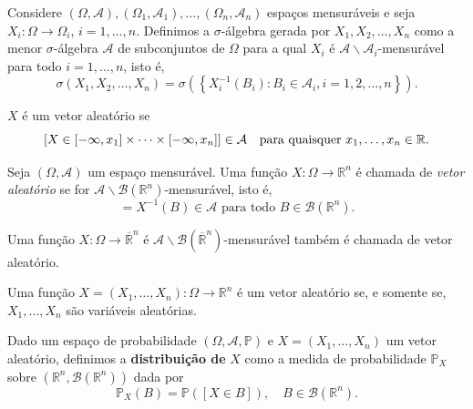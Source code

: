 \begin{definition} 
	Considere $(\Omega, \mathcal{A}), (\Omega_1, \mathcal{A}_1), \ldots, (\Omega_n, \mathcal{A}_n)$ espaços mensuráveis e seja $X_i: \Omega \rightarrow \Omega_i$, $i = 1, \ldots, n$. Definimos a $\sigma$-álgebra gerada por $X_1, X_2, \ldots, X_n$ como a menor $\sigma$-álgebra $\mathcal{A}$ de subconjuntos de $\Omega$ para a qual $X_i$ é $\mathcal{A}\backslash\mathcal{A}_i$-mensurável para todo $i = 1, \ldots, n$, isto é,
	\begin{equation}
		\sigma(X_1, X_2, \ldots, X_n) = \sigma\left(\left\{X_i^{-1}(B_i) : B_i \in \mathcal{A}_i, i = 1, 2, \ldots, n\right\}\right).
	\end{equation}
\end{definition}

\begin{theorem}
	$X$ é um vetor aleatório se
	\begin{equation}
		\left[X \in [-\infty,x_1]\times\cdots\times[-\infty,x_n]\right] \in \mathcal{A} \quad \text{para quaisquer } x_1,\ldots,x_n \in \mathbb{R}.
	\end{equation}
\end{theorem}

\begin{definition}
	Seja $(\Omega, \mathcal{A})$ um espaço mensurável. Uma função $X : \Omega \rightarrow \mathbb{R}^n$ é chamada de \textit{vetor aleatório} se for $\mathcal{A}\backslash\mathcal{B}(\mathbb{R}^n)$-mensurável, isto é,
	\begin{equation}
		 [X \in B] = X^{-1}(B) \in \mathcal{A} \text{ para todo } B \in 	\mathcal{B}(\mathbb{R}^n).
	 \end{equation}

	Uma função $X : \Omega \rightarrow \overline{\mathbb{R}}^n$ é $\mathcal{A}\backslash\mathcal{B}(\overline{\mathbb{R}}^n)$-mensurável também é chamada de vetor aleatório.
\end{definition}

\begin{theorem}
	Uma função $X = (X_1, \ldots, X_n) : \Omega \rightarrow \mathbb{R}^n$ é um vetor aleatório se, e somente se, $X_1, \ldots, X_n$ são variáveis aleatórias.
\end{theorem}

\begin{definition}
	Dado um espaço de probabilidade $(\Omega, \mathcal{A}, \mathbb{P})$ e $X = (X_1, \ldots, X_n)$ um vetor aleatório, definimos a \textbf{distribuição de} $X$ como a medida de probabilidade $\mathbb{P}_X$ sobre $\left(\mathbb{R}^n, \mathcal{B}(\mathbb{R}^n)\right)$ dada por
	\begin{equation}
		\mathbb{P}_X(B) = \mathbb{P}\left([X \in B]\right), \quad B \in \mathcal{B}(\mathbb{R}^n).
	\end{equation}
\end{definition}

